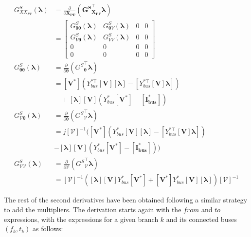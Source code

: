 \begin{equation}
\begin{aligned}
    G^S_{XX_{PF}}(\bm{\lambda}) &= \frac{\partial}{\partial \bm{X_{PF}}} (\bm{{G^S}^\top_{X_{PF}}} \bm{\lambda}) \\
    &= \begin{bmatrix}
    G^S_{\bm{\theta}\bm{\theta}}(\bm{\lambda}) & G^S_{\bm{\theta} V}(\bm{\lambda}) & 0 & 0 \\
    G^S_{V\bm{\theta}}(\bm{\lambda}) & G^S_{VV}(\bm{\lambda}) & 0 & 0 \\
    0 & 0 & 0 & 0 \\
    0 & 0 & 0 & 0
    \end{bmatrix} \\
    G^S_{\bm{\theta}\bm{\theta}}(\bm{\lambda}) &= \frac{\partial}{\partial \bm{\theta}} ({G^S}^\top_{\bm{\theta}} \bm{\lambda}) \\
    &= \left[ \bm{V^*} \right] (Y_{bus}^{*\top} \left[ \bm{V} \right] [\bm{\lambda}] -  [Y_{bus}^{*\top} [\bm{V}] \bm{\lambda}])  \\
    & \quad + [\bm{\lambda}] \left[ \bm{V} \right] \left( Y_{bus}^* \left[ \bm{V^*} \right] - \left[ \bm{I_{bus}^*} \right] \right) \\
    G^S_{\bm{\mathcal{V}}\bm{\theta}}(\bm{\lambda}) &= \frac{\partial}{\partial \bm{\theta}} ({G^S}^\top_{\bm{\mathcal{V}}} \bm{\lambda}) \\
    &= j [\bm{\mathcal{V}}]^{-1} ([\bm{V^*}] (Y_{bus}^* [\bm{V}][\bm{\lambda}] - [Y_{bus}^{*\top} [\bm{V}] \bm{\lambda}]) \\
    & - [\bm{\lambda}] [\bm{V}] (Y_{bus}^* [\bm{V^*}] - [\bm{I_{bus}^*}]) ) \\
    G^S_{\bm{\mathcal{V}}\bm{\mathcal{V}}}(\bm{\lambda}) &= \frac{\partial}{\partial \bm{\mathcal{V}}} ({G^S}^\top_{\bm{\mathcal{V}}} \bm{\lambda}) \\
    &= [\bm{\mathcal{V}}]^{-1} \left( [\bm{\lambda}] [\bm{V}] Y_{bus}^* [\bm{V^*}] + [\bm{V^*}] {Y}_{bus}^* [\bm{V}] [\bm{\lambda}] \right) [\bm{\mathcal{V}}]^{-1}
\end{aligned}
\end{equation}

The rest of the second derivatives have been obtained following a similar strategy to add the multipliers. The derivation starts again with the $from$ and $to$ expressions, with the expressions for a given branch $k$ and its connected buses $(f_k, t_k)$ as follows:

